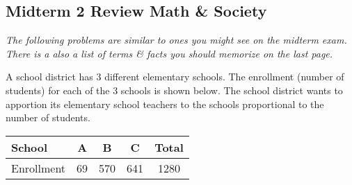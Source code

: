 \documentclass[11pt]{exam}
\begin{document}
\pagestyle{empty}
\graphicspath{{/home/brian/Dropbox/HSC/Spring16/Math111/}}

\subsection*{Midterm 2 Review \hfill Math \& Society}

\textit{The following problems are similar to ones you might see on the midterm exam. There is a also a list of terms \& facts you should memorize on the last page.}

\begin{questions}

\question A school district has 3 different elementary schools.  The enrollment (number of students) for each of the 3 schools is shown below. The school district wants to apportion its elementary school teachers to the schools proportional to the number of students.
\begin{center}
\begin{tabular}{l|ccc|c}
School & A & B & C & Total \\ \hline
Enrollment & 69 & 570 & 641 & 1280 
\end{tabular}
\end{center}

\end{questions}
\end{document}
